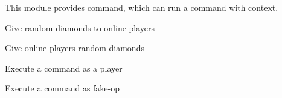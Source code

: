 
This module provides  command, which can run a command with context.


\begin{example}{Give random diamonds to online players}
\end{example}

\begin{example}{Give online players random diamonds}
\end{example}

\begin{example}{Execute a command as a player}
\end{example}

\begin{example}{Execute a command as fake-op}
\end{example}

